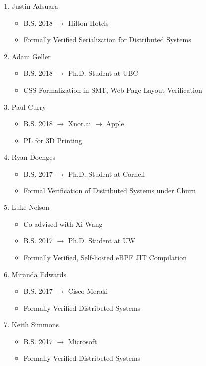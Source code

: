 \documentclass[10pt]{article}
\begin{document}
\begin{enumerate}[resume]
  \item Justin Adsuara
    \begin{itemize}
      \item B.S. 2018 $\rightarrow$ Hilton Hotels
      \item Formally Verified Serialization for Distributed Systems
    \end{itemize}

  \item Adam Geller
    \begin{itemize}
      \item B.S. 2018 $\rightarrow$ Ph.D. Student at UBC
      \item CSS Formalization in SMT, Web Page Layout Verification
    \end{itemize}

  \item Paul Curry
    \begin{itemize}
      \item B.S. 2018 $\rightarrow$ Xnor.ai
                      $\rightarrow$ Apple
      \item PL for 3D Printing
    \end{itemize}

  \item Ryan Doenges
    \begin{itemize}
      \item B.S. 2017 $\rightarrow$ Ph.D. Student at Cornell
      \item Formal Verification of Distributed Systems under Churn
    \end{itemize}

  \item Luke Nelson
    \begin{itemize}
      \item Co-advised with Xi Wang
      \item B.S. 2017 $\rightarrow$ Ph.D. Student at UW
      \item Formally Verified, Self-hosted eBPF JIT Compilation
    \end{itemize}

  \item Miranda Edwards
    \begin{itemize}
      \item B.S. 2017 $\rightarrow$ Cisco Meraki
      \item Formally Verified Distributed Systems
    \end{itemize}

  \item Keith Simmons
    \begin{itemize}
      \item B.S. 2017 $\rightarrow$ Microsoft
      \item Formally Verified Distributed Systems
    \end{itemize}


\end{enumerate}
\end{document}
